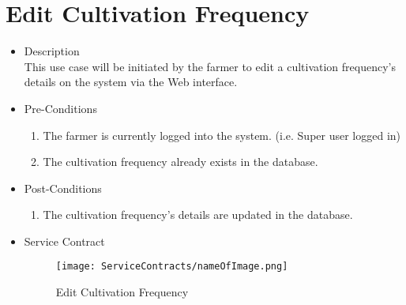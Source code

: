 \documentclass[11pt,fleqn]{book} %
\begin{document}
\section{Edit Cultivation Frequency}
\begin{itemize}
	\item Description\\
	This use case will be initiated by the farmer to edit a cultivation frequency’s details on the system via the Web interface.
	\item Pre-Conditions
	\begin{enumerate}
		\item The farmer is currently logged into the system. (i.e. Super user logged in)
		\item The cultivation frequency already exists in the database.					
	\end{enumerate}
	\item Post-Conditions
	\begin{enumerate}
		\item The cultivation frequency’s details are updated in the database.
	\end{enumerate}
	\item Service Contract
	\begin{figure}
		\texttt{[image: ServiceContracts/nameOfImage.png]}
		\caption{Edit Cultivation Frequency}
	\end{figure}
\end{itemize}
\end{document}
